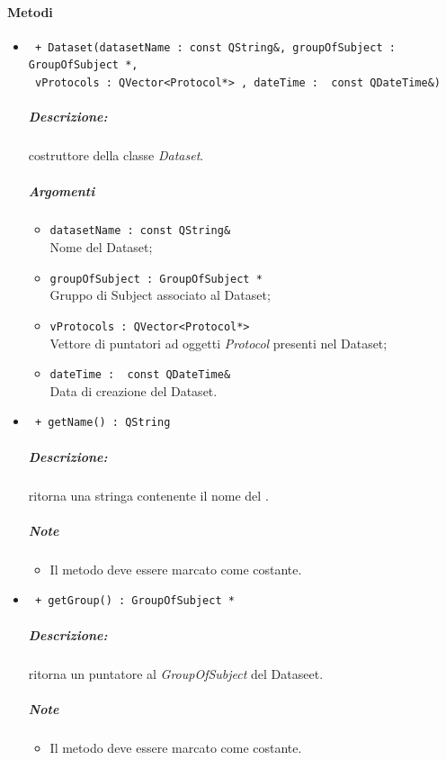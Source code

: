 \paragraph{Metodi \\}
	\begin{itemize}
		\item \color{blue}\verb! + Dataset(datasetName : const QString&, groupOfSubject : GroupOfSubject *,!\\
							    \verb! vProtocols : QVector<Protocol*> , dateTime :  const QDateTime&)!\\
		\color{black}
		\subparagraph{Descrizione:} costruttore della classe \textsl{Dataset}.
		\subparagraph{Argomenti}
			\begin{itemize}
				\item \color{RoyalPurple}\verb!datasetName : const QString&!\\
				\color{black}Nome del Dataset\g{};
				
				\item \color{RoyalPurple}\verb!groupOfSubject : GroupOfSubject *!\\
				\color{black}Gruppo di Subject\g{} associato al Dataset\g{};
				
				\item \color{RoyalPurple}\verb!vProtocols : QVector<Protocol*>!\\
				\color{black}Vettore di puntatori ad oggetti \textsl{Protocol} presenti nel Dataset\g{};
				
				\item \color{RoyalPurple}\verb!dateTime :  const QDateTime&!\\
				\color{black}Data di creazione del Dataset\g{}.
			\end{itemize}
		
		\item \color{blue}\verb! + getName() : QString !\\
		\color{black}
		\subparagraph{Descrizione:} ritorna una stringa contenente il nome del \dataset{}.
		\subparagraph{Note}
			\begin{itemize}
				\item Il metodo deve essere marcato come costante.
			\end{itemize}
			
		\item \color{blue}\verb! + getGroup() : GroupOfSubject * !\\
		\color{black}
		\subparagraph{Descrizione:} ritorna un puntatore al \textsl{GroupOfSubject} del Dataseet\g{}.
		\subparagraph{Note}
			\begin{itemize}
				\item Il metodo deve essere marcato come costante.
			\end{itemize}
			

\end{itemize}
